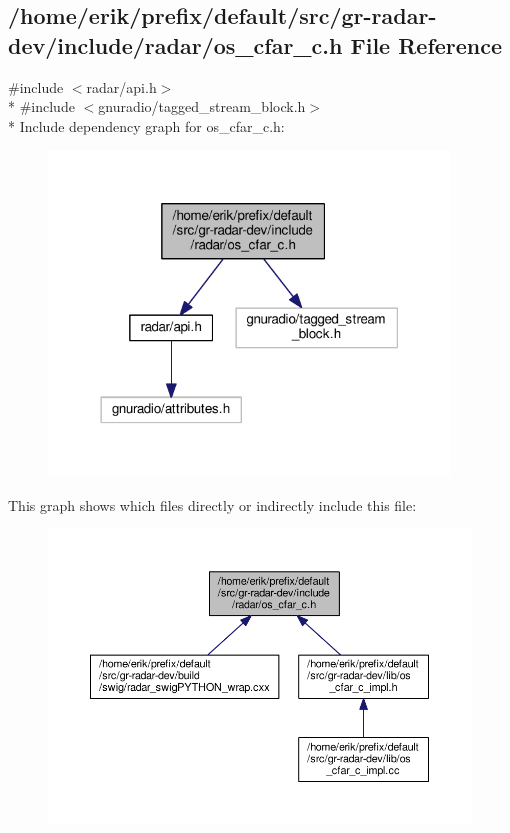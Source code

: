 \subsection{/home/erik/prefix/default/src/gr-\/radar-\/dev/include/radar/os\+\_\+cfar\+\_\+c.h File Reference}
\label{os__cfar__c_8h}
{\ttfamily \#include $<$radar/api.\+h$>$}\\*
{\ttfamily \#include $<$gnuradio/tagged\+\_\+stream\+\_\+block.\+h$>$}\\*
Include dependency graph for os\+\_\+cfar\+\_\+c.\+h\+:
\nopagebreak
\begin{figure}[H]
\begin{center}
\leavevmode
\includegraphics[width=302pt]{de/d7e/os__cfar__c_8h__incl}
\end{center}
\end{figure}
This graph shows which files directly or indirectly include this file\+:
\nopagebreak
\begin{figure}[H]
\begin{center}
\leavevmode
\includegraphics[width=350pt]{de/daf/os__cfar__c_8h__dep__incl}
\end{center}
\end{figure}
